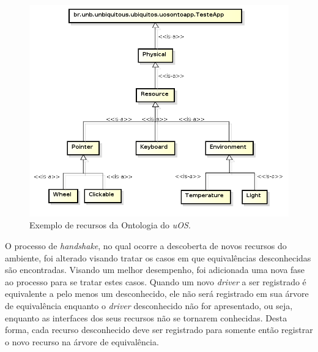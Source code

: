 \begin{figure}[ht]
	\center
	\includegraphics[scale=0.7]{imagens/ontologia}
	\caption{Exemplo de recursos da Ontologia do \emph{uOS}.}
	\label{fig:ontologiaUOS}
\end{figure}

O processo de \emph{handshake}, no qual ocorre a descoberta de novos recursos do ambiente, foi alterado visando tratar os casos em que equivalências desconhecidas são encontradas. Visando um melhor desempenho, foi adicionada uma nova fase ao processo para se tratar estes casos. Quando um novo \emph{driver} a ser registrado é equivalente a pelo menos um desconhecido, ele não será registrado em sua árvore de equivalência enquanto o \emph{driver} desconhecido não for apresentado, ou seja, enquanto as interfaces dos seus recursos não se tornarem conhecidas. Desta forma, cada recurso desconhecido deve ser registrado para somente então registrar o novo recurso na árvore de equivalência.
